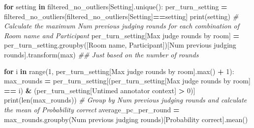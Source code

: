 \documentclass[
]{article}
\newenvironment{Shaded}{\begin{snugshade}}{\end{snugshade}}
\newcommand{\BuiltInTok}[1]{#1}
\newcommand{\CommentTok}[1]{\textcolor[rgb]{0.56,0.35,0.01}{\textit{#1}}}
\newcommand{\ControlFlowTok}[1]{\textcolor[rgb]{0.13,0.29,0.53}{\textbf{#1}}}
\newcommand{\DecValTok}[1]{\textcolor[rgb]{0.00,0.00,0.81}{#1}}
\newcommand{\KeywordTok}[1]{\textcolor[rgb]{0.13,0.29,0.53}{\textbf{#1}}}
\newcommand{\NormalTok}[1]{#1}
\newcommand{\OperatorTok}[1]{\textcolor[rgb]{0.81,0.36,0.00}{\textbf{#1}}}
\newcommand{\StringTok}[1]{\textcolor[rgb]{0.31,0.60,0.02}{#1}}
\begin{document}
\begin{Shaded}
\begin{Highlighting}[]
\ControlFlowTok{for}\NormalTok{ setting }\KeywordTok{in}\NormalTok{ filtered\_no\_outliers[}\StringTok{\textquotesingle{}Setting\textquotesingle{}}\NormalTok{].unique():}
\NormalTok{  per\_turn\_setting }\OperatorTok{=}\NormalTok{ filtered\_no\_outliers[filtered\_no\_outliers[}\StringTok{\textquotesingle{}Setting\textquotesingle{}}\NormalTok{]}\OperatorTok{==}\NormalTok{setting]}
  \BuiltInTok{print}\NormalTok{(setting)}
  \CommentTok{\# Calculate the maximum \textquotesingle{}Num previous judging rounds\textquotesingle{} for each combination of \textquotesingle{}Room name\textquotesingle{} and \textquotesingle{}Participant\textquotesingle{}}
\NormalTok{  per\_turn\_setting[}\StringTok{\textquotesingle{}Max judge rounds by room\textquotesingle{}}\NormalTok{] }\OperatorTok{=}\NormalTok{ per\_turn\_setting.groupby([}\StringTok{\textquotesingle{}Room name\textquotesingle{}}\NormalTok{, }\StringTok{\textquotesingle{}Participant\textquotesingle{}}\NormalTok{])[}\StringTok{\textquotesingle{}Num previous judging rounds\textquotesingle{}}\NormalTok{].transform(}\StringTok{\textquotesingle{}max\textquotesingle{}}\NormalTok{)}
  \CommentTok{\#\# Just based on the number of rounds}
  
  \ControlFlowTok{for}\NormalTok{ i }\KeywordTok{in} \BuiltInTok{range}\NormalTok{(}\DecValTok{1}\NormalTok{, per\_turn\_setting[}\StringTok{\textquotesingle{}Max judge rounds by room\textquotesingle{}}\NormalTok{].}\BuiltInTok{max}\NormalTok{() }\OperatorTok{+} \DecValTok{1}\NormalTok{):}
\NormalTok{      max\_rounds }\OperatorTok{=}\NormalTok{ per\_turn\_setting[(per\_turn\_setting[}\StringTok{\textquotesingle{}Max judge rounds by room\textquotesingle{}}\NormalTok{] }\OperatorTok{==}\NormalTok{ i) }\OperatorTok{\&}\NormalTok{ (per\_turn\_setting[}\StringTok{\textquotesingle{}Untimed annotator context\textquotesingle{}}\NormalTok{] }\OperatorTok{\textgreater{}} \DecValTok{0}\NormalTok{)]}
      \BuiltInTok{print}\NormalTok{(}\BuiltInTok{len}\NormalTok{(max\_rounds))}
      \CommentTok{\# Group by \textquotesingle{}Num previous judging rounds\textquotesingle{} and calculate the mean of \textquotesingle{}Probability correct\textquotesingle{}}
\NormalTok{      average\_pc\_per\_round }\OperatorTok{=}\NormalTok{ max\_rounds.groupby(}\StringTok{\textquotesingle{}Num previous judging rounds\textquotesingle{}}\NormalTok{)[}\StringTok{\textquotesingle{}Probability correct\textquotesingle{}}\NormalTok{].mean()}
  

\end{Highlighting}
\end{Shaded}
\end{document}
